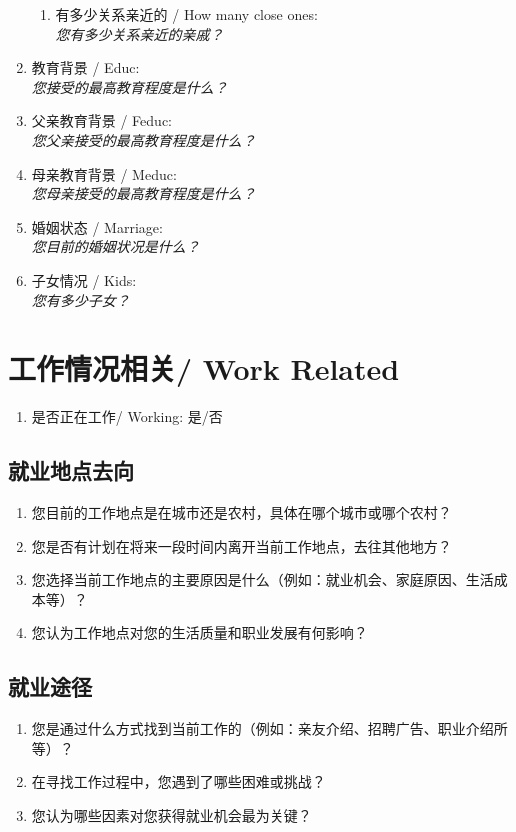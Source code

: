 \documentclass[12pt]{article}
\begin{document}
\begin{enumerate}
    \begin{enumerate}
        \item 有多少关系亲近的 / How many close ones: \\
        \textit{您有多少关系亲近的亲戚？}
    \end{enumerate}
    
    \item 教育背景 / Educ: \\
    \textit{您接受的最高教育程度是什么？}
    \item 父亲教育背景 / Feduc: \\
    \textit{您父亲接受的最高教育程度是什么？}
    \item 母亲教育背景 / Meduc: \\
    \textit{您母亲接受的最高教育程度是什么？}
    \item 婚姻状态 / Marriage: \\
    \textit{您目前的婚姻状况是什么？}
    \item 子女情况 / Kids: \\
    \textit{您有多少子女？}
\end{enumerate}
\section{工作情况相关/ Work Related}
\begin{enumerate}
    \item 是否正在工作/ Working: 是/否

\end{enumerate}

\subsection*{就业地点去向}
\begin{enumerate}
    \item 您目前的工作地点是在城市还是农村，具体在哪个城市或哪个农村？
    \item 您是否有计划在将来一段时间内离开当前工作地点，去往其他地方？
    \item 您选择当前工作地点的主要原因是什么（例如：就业机会、家庭原因、生活成本等）？
    \item 您认为工作地点对您的生活质量和职业发展有何影响？
\end{enumerate}

\subsection*{就业途径}
\begin{enumerate}
    \item 您是通过什么方式找到当前工作的（例如：亲友介绍、招聘广告、职业介绍所等）？
    \item 在寻找工作过程中，您遇到了哪些困难或挑战？
    \item 您认为哪些因素对您获得就业机会最为关键？
\end{enumerate}
\end{document}
